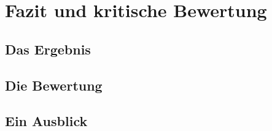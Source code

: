 \chapter{Fazit und kritische Bewertung}
\label{cha:Fazit}


\section{Das Ergebnis}
\label{sec:Ergebnis}

\section{Die Bewertung}
\label{sec:BewertungFrameworks}

\section{Ein Ausblick}
\label{sec:EinAusblick}




